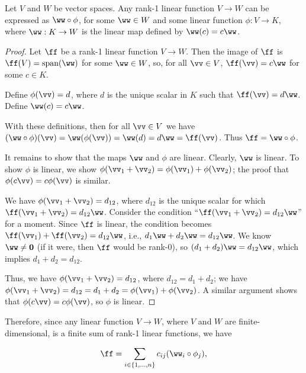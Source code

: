 \begin{theorem}
    Let $V$ and $W$ be vector spaces. Any rank-1 linear function $V \rightarrow W$ can be expressed as $\ww \circ \phi$, for some $\ww \in W$ and some linear function $\phi:V \rightarrow K$, where $\ww:K \rightarrow W$ is the linear map defined by $\ww(c) = c \ww$.
\end{theorem}

\begin{proof}
    Let $\ff$ be a rank-1 linear function $V \rightarrow W$. Then the image of $\ff$ is $\ff(V) = \spann(\ww)$ for some $\ww \in W$, so, for all $\vv \in V$, $\ff(\vv) = c\ww$ for some $c \in K$.
    
    Define $\phi(\vv) = d$, where $d$ is the unique scalar in $K$ such that $\ff(\vv) = d \ww$. Define $\ww(c) = c \ww$. 
    
    With these definitions, then for all $\vv \in V$ we have $(\ww \circ \phi)(\vv) = \ww(\phi(\vv)) = \ww(d) = d\ww = \ff(\vv)$. Thus $\ff = \ww \circ \phi$.
    
    It remains to show that the maps $\ww$ and $\phi$ are linear. Clearly, $\ww$ is linear. To show $\phi$ is linear, we show $\phi(\vv_1 + \vv_2) = \phi(\vv_1) + \phi(\vv_2)$; the proof that $\phi(c\vv) = c\phi(\vv)$ is similar.
    
    We have $\phi(\vv_1 + \vv_2) = d_{12}$, where $d_{12}$ is the unique scalar for which $\ff(\vv_1 + \vv_2) = d_{12} \ww$. Consider the condition ``$\ff(\vv_1 + \vv_2) = d_{12} \ww$'' for a moment. Since $\ff$ is linear, the condition becomes $\ff(\vv_1) + \ff(\vv_2) = d_{12} \ww$, i.e., $d_1 \ww + d_2 \ww = d_{12} \ww$. We know $\ww \neq \mathbf{0}$ (if it were, then $\ff$ would be rank-0), so $(d_1 + d_2) \ww = d_{12} \ww$, which implies $d_1 + d_2 = d_{12}$.
    
    Thus, we have $\phi(\vv_1 + \vv_2) = d_{12}$, where $d_{12} = d_1 + d_2$; we have $\phi(\vv_1 + \vv_2) = d_{12} = d_1 + d_2 = \phi(\vv_1) + \phi(\vv_2)$. A similar argument shows that $\phi(c\vv) = c\phi(\vv)$, so $\phi$ is linear.
\end{proof}

Therefore, since any linear function $V \rightarrow W$, where $V$ and $W$ are finite-dimensional, is a finite sum of rank-1 linear functions, we have

\begin{align*}
    \ff = \sum_{\substack{i \in \{1, ..., n\}}} c_{ij} (\ww_i \circ \phi_j),
\end{align*}


